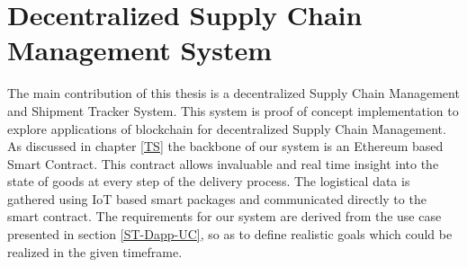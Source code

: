 \section{Decentralized Supply Chain Management System} \label{usecase} 
The main contribution of this thesis is a decentralized Supply Chain Management and Shipment Tracker System. This system is proof of concept implementation to explore applications of blockchain for decentralized Supply Chain Management. As discussed in chapter \ref{TS} the backbone of our system is an Ethereum based Smart Contract. This contract allows invaluable and real time insight into the state of goods at every step of the delivery process. The logistical data is gathered using IoT based smart packages and communicated directly to the smart contract. The requirements for our system are derived from the use case presented in section \ref{ST-Dapp-UC}, so as to define realistic goals which could be realized in the given timeframe.

\vspace{0.5cm}
